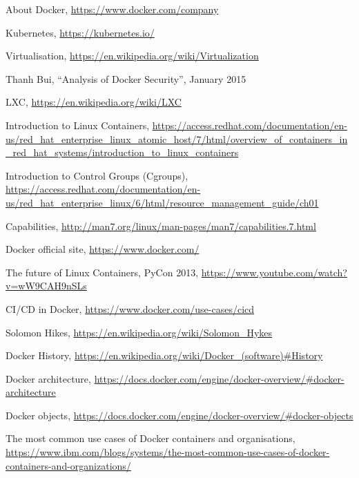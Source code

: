 \documentclass[a4paper,12pt]{article}
\begin{document}
\begin{thebibliography}{99}

About Docker, \url{https://www.docker.com/company}

Kubernetes, \url{https://kubernetes.io/}

Virtualisation,
\url{https://en.wikipedia.org/wiki/Virtualization}

Thanh Bui, ``Analysis of Docker Security'', January 2015

LXC, \url{https://en.wikipedia.org/wiki/LXC}

Introduction to Linux Containers, \url{https://access.redhat.com/documentation/en-us/red_hat_enterprise_linux_atomic_host/7/html/overview_of_containers_in_red_hat_systems/introduction_to_linux_containers}
  
Introduction to Control Groups (Cgroups),
\url{https://access.redhat.com/documentation/en-us/red_hat_enterprise_linux/6/html/resource_management_guide/ch01}

Capabilities, \url{http://man7.org/linux/man-pages/man7/capabilities.7.html}

Docker official site, \url{https://www.docker.com/}

The future of Linux Containers, PyCon 2013,
\url{https://www.youtube.com/watch?v=wW9CAH9nSLs}

CI/CD in Docker, \url{https://www.docker.com/use-cases/cicd}

Solomon Hikes,
\url{https://en.wikipedia.org/wiki/Solomon_Hykes}

Docker History,
\url{https://en.wikipedia.org/wiki/Docker_(software)#History}

Docker architecture,
\url{https://docs.docker.com/engine/docker-overview/#docker-architecture}

Docker objects,
\url{https://docs.docker.com/engine/docker-overview/#docker-objects}

The most common use cases of Docker containers and organisations,
\url{https://www.ibm.com/blogs/systems/the-most-common-use-cases-of-docker-containers-and-organizations/}


\end{thebibliography}
\end{document}
